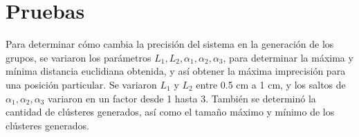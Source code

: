 \section{Pruebas}

Para determinar cómo cambia la precisión del sistema en la generación de los grupos, se variaron los parámetros $L_1, L_2, \alpha_1, \alpha_2, \alpha_3$, para determinar la máxima y mínima distancia euclidiana obtenida, y así obtener la máxima imprecisión para una posición particular. Se variaron $L_1$ y $L_2$ entre 0.5 cm a 1 cm, y los saltos de $\alpha_1, \alpha_2, \alpha_3$ variaron en un factor desde 1 hasta 3. También se determinó la cantidad de clústeres generados, así como el tamaño máximo y mínimo de los clústeres generados.